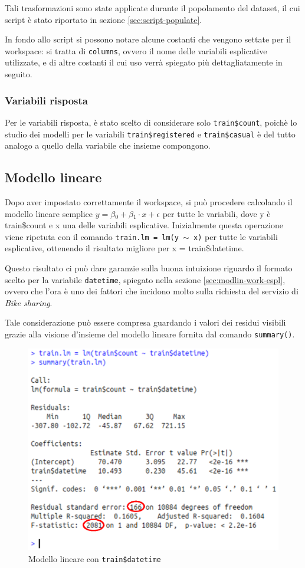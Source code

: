 Tali trasformazioni sono state applicate durante il popolamento del dataset, il
cui script è stato riportato in sezione \ref{sec:script-populate}.

In fondo allo script si possono notare alcune costanti che vengono settate per
il workspace: si tratta di \texttt{columns}, ovvero il nome delle variabili
esplicative utilizzate, e di altre costanti il cui uso verrà spiegato più
dettagliatamente in seguito.

\subsubsection{Variabili risposta}
Per le variabili risposta, è stato scelto di considerare solo
\texttt{train\$count}, poichè lo studio dei modelli per le variabili
\texttt{train\$registered} e \texttt{train\$casual} è del tutto analogo a
quello della variabile che insieme compongono.

\subsection{Modello lineare}\label{sec:mod-lin}
Dopo aver impostato correttamente il workspace, si può procedere calcolando il
modello lineare semplice $ y = \beta{}_0 + \beta{}_1 \cdot{} x + \epsilon{} $
per tutte le variabili, dove y è train\$count e x una delle variabili
esplicative.
Inizialmente questa operazione viene ripetuta con il comando \texttt{train.lm
= lm(y $ \sim{} $ x)} per tutte le variabili esplicative, ottenendo il
risultato migliore per x = train\$datetime.

Questo risultato ci può dare garanzie sulla buona intuizione riguardo il
formato scelto per la variabile \texttt{datetime}, spiegato nella sezione
\ref{sec:modlin-work-espl}, ovvero che l'ora è uno dei fattori che incidono
molto sulla richiesta del servizio di \emph{Bike sharing}.

Tale considerazione può essere compresa guardando i valori dei residui visibili
grazie alla visione d'insieme del modello lineare fornita dal comando
\texttt{summary()}.

\begin{figure}[H]\label{fig:simplest-linear-model}
  \centering
  \includegraphics[width=.7\columnwidth]{images/simplest-linear-model.eps}
  \caption{Modello lineare con \texttt{train\$datetime}}
\end{figure}


